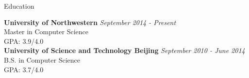 \documentclass{resume} %
\begin{document}

\begin{rSection}{Education}

{\bf University of Northwestern} \hfill {\em September 2014 - Present} \\ 
Master in Computer Science \\
GPA: 3.9/4.0\\
{\bf University of Science and Technology Beijing} \hfill {\em September 2010 - June 2014} \\ 
B.S. in Computer Science \\
GPA: 3.7/4.0
\end{rSection}

\end{document}

